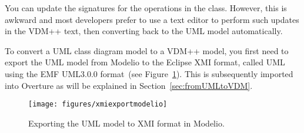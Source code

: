 You can update the signatures for the operations in the  class. However, this is awkward and most developers prefer to use a text editor to perform such updates in the VDM++ text, then converting back to the UML model automatically.

To convert a UML class diagram model to a VDM++ model, you first need to export the UML model from Modelio to the Eclipse XMI format, called UML using the EMF UML3.0.0 format~(see Figure~\ref{fig:xmiexportmodelio}). This is subsequently imported into Overture as will be explained in Section~\ref{sec:fromUMLtoVDM}.
%
\begin{figure}[htbp]
\begin{center}
\texttt{[image: figures/xmiexportmodelio]}
\caption{Exporting the UML model to XMI format in Modelio.\label{fig:xmiexportmodelio}}
\end{center}
\end{figure}
%




